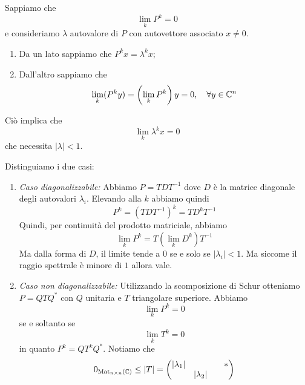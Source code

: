 \documentclass[a4paper]{article}
\begin{document}
\begin{snippetproof}{}
    \begin{iffproof}
    \item Sappiamo che \[
            \lim_k P^k = 0
        \]
        e consideriamo \(\lambda\) autovalore
        di \(P\) con autovettore associato \(x \neq 0\).
        \begin{enumerate}
            \item Da un lato sappiamo che \(P^k x = \lambda^k x\);
            \item Dall'altro sappiamo che
                \[
                    \lim_k (P^k y) = \left(
                        \lim_k P^k
                    \right) y = 0, \quad \forall y \in \mathbb{C}^n
                \]
        \end{enumerate}
        Ciò implica che
        \[
            \lim_k \lambda^k x = 0
        \]
        che necessita \(|\lambda| < 1\).
    \item Distinguiamo i due casi:
        \begin{enumerate}
            \item \emph{Caso diagonalizzabile:}
                Abbiamo \(P = TDT^{-1}\)
                dove \(D\) è la matrice diagonale degli autovalori \(\lambda_i\).
                Elevando alla \(k\) abbiamo quindi \[
                    P^k = (TDT^{-1})^k = T D^k T^{-1}
                \]
                Quindi, per continuità del prodotto matriciale, abbiamo
                \[
                    \lim_k P^k = T \left(\lim_k D^k\right) T^{-1}
                \]
                Ma dalla forma di \(D\), il limite tende a \(0\)
                se e solo se \(|\lambda_i| < 1\).
                Ma siccome il raggio spettrale è minore di \(1\) allora vale.
            \item \emph{Caso non diagonalizzabile:}
                Utilizzando la scomposizione di Schur otteniamo
                \(P = QTQ^*\) con \(Q\) unitaria e \(T\) triangolare superiore.
                Abbiamo
                \[
                    \lim_k P^k = 0
                \]
                se e soltanto se
                \[
                    \lim_k T^k = 0
                \]
                in quanto \(P^k = QT^k Q^*\).
                Notiamo che \[
                    0_{\operatorname{Mat}_{n \times n}(\mathbb{C})} \leq |T|
                    =
                    \begin{pmatrix}
                        |\lambda_1| &  &  & \ast \\
                        & |\lambda_2| & &  \\

\end{pmatrix}\]
\end{enumerate}
\end{iffproof}
\end{snippetproof}
\end{document}

